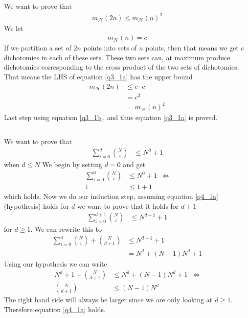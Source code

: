 \documentclass[a4paper]{article}
\begin{document}
\subsection{}
We want to prove that
\begin{align}
m_{\mathcal{H}}(2n)\leq m_{\mathcal{H}}(n)^2
\label{q3_1a}
\end{align}
We let
\begin{align}\label{q3_1b}
m_{\mathcal{H}}(n)= c
\end{align}
If we partition a set of $2n$ points into sets of $n$ points, then that means we get $c$ dichotomies in each of these sets. These two sets can, at maximum produce dichotomies corresponding to the cross product of the two sets of dichotomies. That means the LHS of equation \ref{q3_1a} has the upper bound
\begin{align*}
m_{\mathcal{H}}(2n)&\leq c\cdot c \\
&=c^2 \\
&=m_{\mathcal{H}}(n)^2
\end{align*}
Last step using equation \ref{q3_1b}, and thus equation \ref{q3_1a} is proved.

\subsection{}
We want to prove that
\begin{align}
\sum_{i=0}^d\binom{N}{i}&\leq N^d+1
\label{q4_1a}
\end{align}
when $d\leq N$
We begin by setting $d=0$ and get
\begin{align*}
\sum_{i=0}^0\binom{N}{i}&\leq N^0+1 &\Leftrightarrow \\
1&\leq1+1
\end{align*}
which holds. Now we do our induction step, assuming equation \ref{q4_1a} (hypothesis) holds for $d$ we want to prove that it holds for $d+1$
\begin{align*}
\sum_{i=0}^{d+1}\binom{N}{i}&\leq N^{d+1}+1
\end{align*}
for $d\geq 1$. We can rewrite this to
\begin{align*}
\sum_{i=0}^{d}\binom{N}{i}+\binom{N}{d+1}&\leq N^{d+1}+1 \\
&=N^d+(N-1)N^d+1
\end{align*}
Using our hypothesis we can write
\begin{align*}
N^d+1+\binom{N}{d+1}&\leq N^d+(N-1)N^d+1 &\Leftrightarrow \\
\binom{N}{d+1}&\leq (N-1)N^d
\end{align*}
The right hand side will always be larger since we are only looking at $d\geq 1$. Therefore equation \ref{q4_1a} holds.
\end{document}
